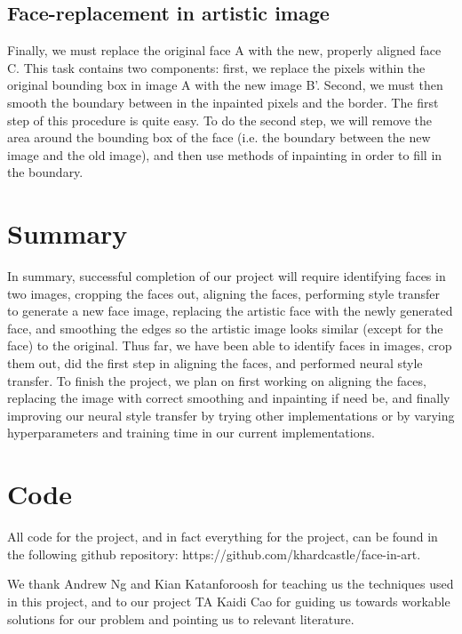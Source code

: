 \documentclass{pnastwo2}
\begin{document}
\begin{article}
\subsection{Face-replacement in artistic image}

Finally, we must replace the original face A with the new, properly aligned face C. This task contains two components: first, we replace the pixels within the original bounding box in image A with the new image B'. Second, we must then smooth the boundary between in the inpainted pixels and the border. The first step of this procedure is quite easy. To do the second step, we will remove the area around the bounding box of the face (i.e. the boundary between the new image and the old image), and then use methods of inpainting in order to fill in the boundary. 

\section{Summary}

In summary, successful completion of our project will require identifying faces in two images, cropping the faces out, aligning the faces, performing style transfer to generate a new face image, replacing the artistic face with the newly generated face, and smoothing the edges so the artistic image looks similar (except for the face) to the original. Thus far, we have been able to identify faces in images, crop them out, did the first step in aligning the faces, and performed neural style transfer. To finish the project, we plan on first working on aligning the faces, replacing the image with correct smoothing and inpainting if need be, and finally improving our neural style transfer by trying other implementations or by varying hyperparameters and training time in our current implementations.

\section{Code}

All code for the project, and in fact everything for the project, can be found in the following github repository: https://github.com/khardcastle/face-in-art.


\begin{acknowledgments}
We thank Andrew Ng and Kian Katanforoosh for teaching us the techniques used in this project, and to our project TA Kaidi Cao for guiding us towards workable solutions for our problem and pointing us to relevant literature.
\end{acknowledgments}





\end{article}
\end{document}
